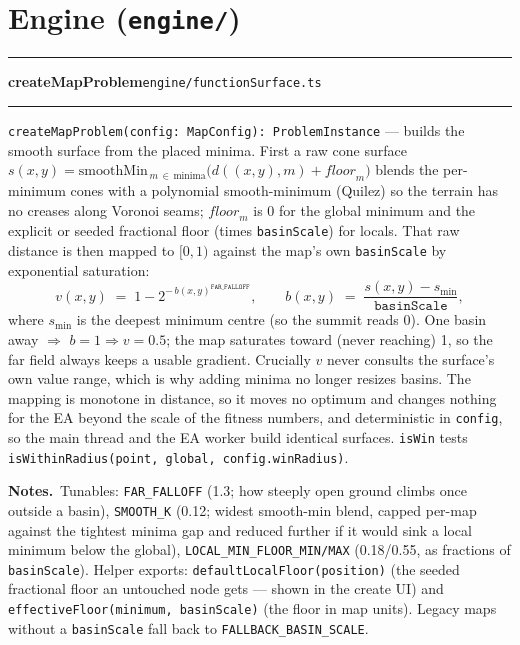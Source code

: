 \documentclass[11pt,a4paper]{report}
\newcommand{\srcfile}[1]{\texttt{\small #1}}   %
\newcommand{\ts}[1]{\texttt{#1}}               %
\newenvironment{apientry}[2]{%
  \par\medskip\noindent
  \begin{minipage}{\textwidth}
  \hrule\vspace{0.6ex}
  {\large\ttfamily\bfseries #1}\hfill{\footnotesize\srcfile{#2}}
  \vspace{0.4ex}\hrule\medskip
}{%
  \end{minipage}\par\medskip
}
\newcommand{\apifield}[1]{\par\smallskip\noindent\textbf{#1.}\ }
\begin{document}
\section{Engine (\srcfile{engine/})}

\begin{apientry}{createMapProblem}{engine/functionSurface.ts}
\ts{createMapProblem(config: MapConfig): ProblemInstance} --- builds the
smooth surface from the placed minima. First a raw cone surface
$s(x,y) = \mathrm{smoothMin}_{\,m\,\in\,\mathrm{minima}}
\bigl(d((x,y),m) + \mathit{floor}_m\bigr)$ blends the per-minimum cones with
a polynomial smooth-minimum (Quilez) so the terrain has no creases along
Voronoi seams; $\mathit{floor}_m$ is 0 for the global minimum and the
explicit or seeded fractional floor (times \ts{basinScale}) for locals.
That raw distance is then mapped to $[0,1)$ against the map's own
\ts{basinScale} by exponential saturation:
\[
  v(x, y) \;=\; 1 - 2^{-\,b(x,y)^{\ts{FAR\_FALLOFF}}},
  \qquad
  b(x,y) \;=\; \frac{s(x,y) - s_{\min}}{\ts{basinScale}},
\]
where $s_{\min}$ is the deepest minimum centre (so the summit reads 0). One
basin away $\Rightarrow$ $b=1 \Rightarrow v=0.5$; the map saturates toward
(never reaching) 1, so the far field always keeps a usable gradient.
Crucially $v$ never consults the surface's own value range, which is why
adding minima no longer resizes basins. The mapping is monotone in
distance, so it moves no optimum and changes nothing for the EA beyond the
scale of the fitness numbers, and deterministic in \ts{config}, so the main
thread and the EA worker build identical surfaces. \ts{isWin} tests
\ts{isWithinRadius(point, global, config.winRadius)}.
\apifield{Notes}Tunables: \ts{FAR\_FALLOFF} (1.3; how steeply open ground
climbs once outside a basin), \ts{SMOOTH\_K} (0.12; widest smooth-min blend,
capped per-map against the tightest minima gap and reduced further if it
would sink a local minimum below the global),
\ts{LOCAL\_MIN\_FLOOR\_MIN/MAX} (0.18/0.55, as fractions of \ts{basinScale}).
Helper exports: \ts{defaultLocalFloor(position)} (the seeded fractional
floor an untouched node gets --- shown in the create UI) and
\ts{effectiveFloor(minimum, basinScale)} (the floor in map units). Legacy
maps without a \ts{basinScale} fall back to \ts{FALLBACK\_BASIN\_SCALE}.
\end{apientry}
\end{document}
